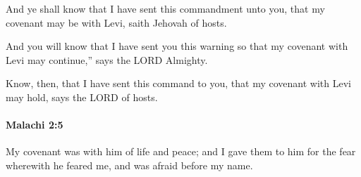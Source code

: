 			\begin{versebox}
					\item[BHS] 
					\item[LXX] 
					\item[ASV] And ye shall know that I have sent this commandment unto you, that my covenant may be with Levi, saith Jehovah of hosts.
					\item[NIV] And you will know that I have sent you this warning so that my covenant with Levi may continue,” says the LORD Almighty.
					\item[NRSV] Know, then, that I have sent this command to you, that my covenant with Levi may hold, says the LORD of hosts.
			\end{versebox}

		\paragraph{Malachi 2:5} %
			\label{MALACHI-2-5}

			My covenant was with him of life and peace; and I gave them to him for the fear wherewith he feared me, and was afraid before my name.

